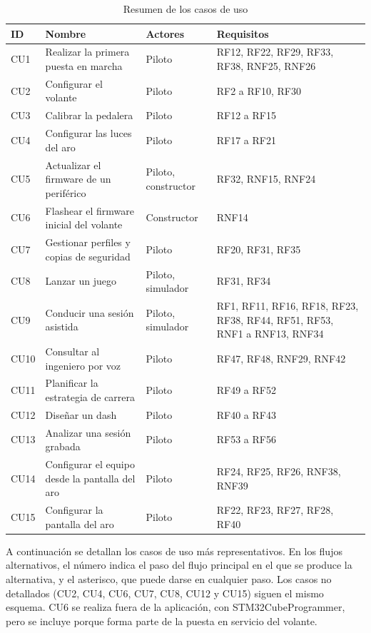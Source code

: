 \begin{table}[H]
	\centering
	\renewcommand{\arraystretch}{1.4}
	\small
	\begin{tabularx}{\textwidth}{|l|>{\raggedright\arraybackslash}p{4.4cm}|>{\raggedright\arraybackslash}p{2.3cm}|>{\raggedright\arraybackslash}X|}
		\hline
		\textbf{ID} & \textbf{Nombre} & \textbf{Actores} & \textbf{Requisitos} \\
		\hline
		CU1 & Realizar la primera puesta en marcha & Piloto & RF12, RF22, RF29, RF33, RF38, RNF25, RNF26 \\
		\hline
		CU2 & Configurar el volante & Piloto & RF2 a RF10, RF30 \\
		\hline
		CU3 & Calibrar la pedalera & Piloto & RF12 a RF15 \\
		\hline
		CU4 & Configurar las luces del aro & Piloto & RF17 a RF21 \\
		\hline
		CU5 & Actualizar el firmware de un periférico & Piloto, constructor & RF32, RNF15, RNF24 \\
		\hline
		CU6 & Flashear el firmware inicial del volante & Constructor & RNF14 \\
		\hline
		CU7 & Gestionar perfiles y copias de seguridad & Piloto & RF20, RF31, RF35 \\
		\hline
		CU8 & Lanzar un juego & Piloto, simulador & RF31, RF34 \\
		\hline
		CU9 & Conducir una sesión asistida & Piloto, simulador & RF1, RF11, RF16, RF18, RF23, RF38, RF44, RF51, RF53, RNF1 a RNF13, RNF34 \\
		\hline
		CU10 & Consultar al ingeniero por voz & Piloto & RF47, RF48, RNF29, RNF42 \\
		\hline
		CU11 & Planificar la estrategia de carrera & Piloto & RF49 a RF52 \\
		\hline
		CU12 & Diseñar un dash & Piloto & RF40 a RF43 \\
		\hline
		CU13 & Analizar una sesión grabada & Piloto & RF53 a RF56 \\
		\hline
		CU14 & Configurar el equipo desde la pantalla del aro & Piloto & RF24, RF25, RF26, RNF38, RNF39 \\
		\hline
		CU15 & Configurar la pantalla del aro & Piloto & RF22, RF23, RF27, RF28, RF40 \\
		\hline
	\end{tabularx}
	\caption{Resumen de los casos de uso}
	\label{tab:cu-resumen}
\end{table}

A continuación se detallan los casos de uso más representativos. En los flujos alternativos, el número indica el paso del flujo principal en el que se produce la alternativa, y el asterisco, que puede darse en cualquier paso. Los casos no detallados (CU2, CU4, CU6, CU7, CU8, CU12 y CU15) siguen el mismo esquema. CU6 se realiza fuera de la aplicación, con STM32CubeProgrammer, pero se incluye porque forma parte de la puesta en servicio del volante.

